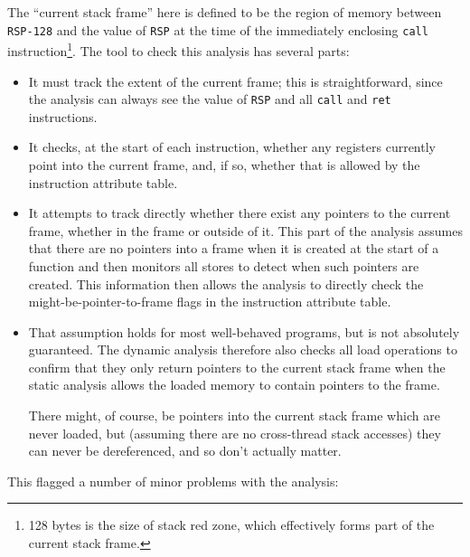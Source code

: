 The ``current stack frame'' here is defined to be the region of memory
between \verb|RSP-128| and the value of \verb|RSP| at the time of the
immediately enclosing \verb|call| instruction\footnote{128 bytes is
the size of stack red zone, which effectively forms part of the
current stack frame.}.  The tool to check this analysis
has several parts:

\begin{itemize}
\item
  It must track the extent of the current frame; this is
  straightforward, since the analysis can always see the value
  of \verb|RSP| and all \verb|call| and \verb|ret| instructions.
\item
  It checks, at the start of each instruction, whether any registers
  currently point into the current frame, and, if so, whether that is
  allowed by the instruction attribute table.
\item
  It attempts to track directly whether there exist any pointers to
  the current frame, whether in the frame or outside of it.  This part
  of the analysis assumes that there are no pointers into a frame when
  it is created at the start of a function and then monitors all
  stores to detect when such pointers are created.  This information
  then allows the analysis to directly check the
  might-be-pointer-to-frame flags in the instruction attribute table.
\item
  That assumption holds for most well-behaved programs, but is not
  absolutely guaranteed.  The dynamic analysis therefore also checks
  all load operations to confirm that they only return pointers to the
  current stack frame when the static analysis allows the loaded
  memory to contain pointers to the frame.

  There might, of course, be pointers into the current stack frame
  which are never loaded, but (assuming there are no cross-thread
  stack accesses) they can never be dereferenced, and so don't
  actually matter.
\end{itemize}

This flagged a number of minor problems with the analysis:


